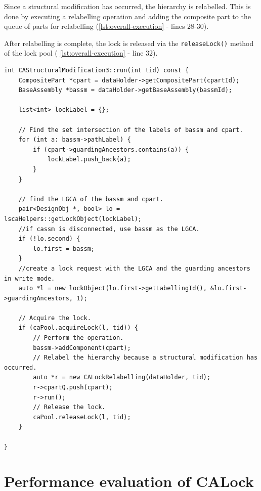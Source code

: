 Since a structural modification has occurred, the hierarchy is relabelled. This is done by executing a relabelling operation and adding the composite part to the queue of parts for relabelling (\cref{lst:overall-execution} - lines 28-30). 

After relabelling is complete, the lock is released via the \texttt{releaseLock()} method of the lock pool ( \cref{lst:overall-execution} - line 32).


\begin{lstlisting}[caption={Overall execution of an operation in CALock.}, label={lst:overall-execution}]
int CAStructuralModification3::run(int tid) const {
    CompositePart *cpart = dataHolder->getCompositePart(cpartId);
    BaseAssembly *bassm = dataHolder->getBaseAssembly(bassmId);

    list<int> lockLabel = {};

    // Find the set intersection of the labels of bassm and cpart.
    for (int a: bassm->pathLabel) {
        if (cpart->guardingAncestors.contains(a)) {
            lockLabel.push_back(a);
        }
    }

    // find the LGCA of the bassm and cpart.
    pair<DesignObj *, bool> lo = lscaHelpers::getLockObject(lockLabel);
    //if cassm is disconnected, use bassm as the LGCA.
    if (!lo.second) {
        lo.first = bassm;
    }
    //create a lock request with the LGCA and the guarding ancestors in write mode. 
    auto *l = new lockObject(lo.first->getLabellingId(), &lo.first->guardingAncestors, 1);

    // Acquire the lock.
    if (caPool.acquireLock(l, tid)) {
        // Perform the operation.
        bassm->addComponent(cpart);
        // Relabel the hierarchy because a structural modification has occurred.
        auto *r = new CALockRelabelling(dataHolder, tid);
        r->cpartQ.push(cpart);
        r->run();
        // Release the lock.
        caPool.releaseLock(l, tid);
    }

}

\end{lstlisting}





\section{Performance evaluation of CALock} \label{chap:evaluation}


